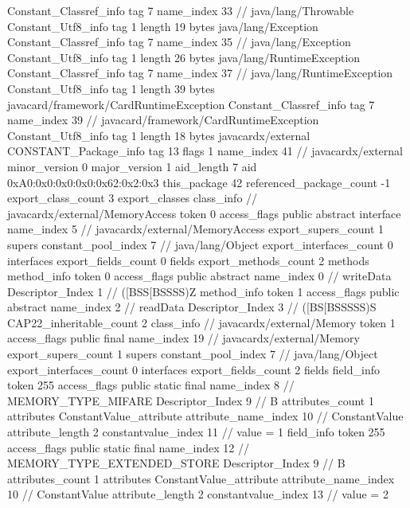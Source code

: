 {{{		}
		Constant_Classref_info {
			tag	7
			name_index	33		// java/lang/Throwable
		}
		Constant_Utf8_info {
			tag	1
			length	19
			bytes	java/lang/Exception
		}
		Constant_Classref_info {
			tag	7
			name_index	35		// java/lang/Exception
		}
		Constant_Utf8_info {
			tag	1
			length	26
			bytes	java/lang/RuntimeException
		}
		Constant_Classref_info {
			tag	7
			name_index	37		// java/lang/RuntimeException
		}
		Constant_Utf8_info {
			tag	1
			length	39
			bytes	javacard/framework/CardRuntimeException
		}
		Constant_Classref_info {
			tag	7
			name_index	39		// javacard/framework/CardRuntimeException
		}
		Constant_Utf8_info {
			tag	1
			length	18
			bytes	javacardx/external
		}
		CONSTANT_Package_info {
			tag	13
			flags	1
			name_index	41		// javacardx/external
			minor_version	0
			major_version	1
			aid_length	7
			aid	0xA0:0x0:0x0:0x0:0x62:0x2:0x3
		}
	}
	this_package	42
	referenced_package_count	-1
	export_class_count	3
	export_classes {
		class_info {		// javacardx/external/MemoryAccess
			token	0
			access_flags	public abstract interface
			name_index	5		// javacardx/external/MemoryAccess
			export_supers_count	1
			supers {
				constant_pool_index	7		// java/lang/Object
			}
			export_interfaces_count	0
			interfaces {
			}
			export_fields_count	0
			fields {
			}
			export_methods_count	2
			methods {
				method_info {
					token	0
					access_flags	public abstract
					name_index	0		// writeData
					Descriptor_Index	1		// ([BSS[BSSSS)Z
				}
				method_info {
					token	1
					access_flags	public abstract
					name_index	2		// readData
					Descriptor_Index	3		// ([BS[BSSSSS)S
				}
			}
			CAP22_inheritable_count	2
		}
		class_info {		// javacardx/external/Memory
			token	1
			access_flags	public final
			name_index	19		// javacardx/external/Memory
			export_supers_count	1
			supers {
				constant_pool_index	7		// java/lang/Object
			}
			export_interfaces_count	0
			interfaces {
			}
			export_fields_count	2
			fields {
			field_info {
				token	255
				access_flags	public static final
				name_index	8		// MEMORY_TYPE_MIFARE
				Descriptor_Index	9		// B
				attributes_count	1
				attributes {
				ConstantValue_attribute {
					attribute_name_index	10		// ConstantValue
					attribute_length	2
					constantvalue_index	11		// value = 1
				}
				}
			}
			field_info {
				token	255
				access_flags	public static final
				name_index	12		// MEMORY_TYPE_EXTENDED_STORE
				Descriptor_Index	9		// B
				attributes_count	1
				attributes {
				ConstantValue_attribute {
					attribute_name_index	10		// ConstantValue
					attribute_length	2
					constantvalue_index	13		// value = 2
}}}}}}}
